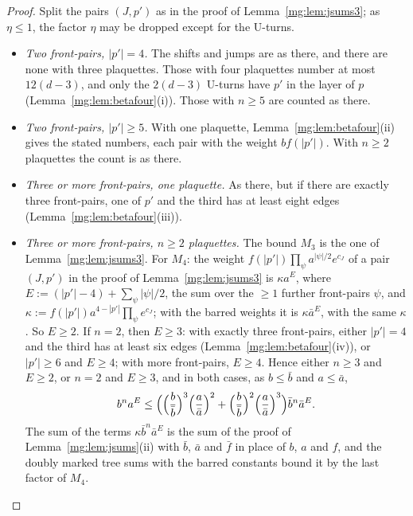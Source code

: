 \documentclass[11pt,a4paper]{article}
\theoremstyle{definition}
\theoremstyle{remark}
\begin{document}
\begin{proof}
Split the pairs $(J,p')$ as in the proof of Lemma~\ref{mg:lem:jsums3}; as $\eta\le1$, the factor $\eta$ may be dropped except for the U-turns.
\begin{itemize}
\item \emph{Two front-pairs, $|p'|=4$.} The shifts and jumps are as there, and there are none with three plaquettes. Those with four plaquettes number at most
$12(d-3)$, and only the $2(d-3)$ U-turns have $p'$ in the layer of $p$ (Lemma~\ref{mg:lem:betafour}(i)). Those with $n\ge5$ are counted as there.
\item \emph{Two front-pairs, $|p'|\ge5$.} With one plaquette, Lemma~\ref{mg:lem:betafour}(ii) gives the stated numbers, each pair with the weight $bf(|p'|)$. With
$n\ge2$ plaquettes the count is as there.
\item \emph{Three or more front-pairs, one plaquette.} As there, but if there are exactly three front-pairs, one of $p'$ and the third has at least eight edges
(Lemma~\ref{mg:lem:betafour}(iii)).
\item \emph{Three or more front-pairs, $n\ge2$ plaquettes.} The bound $M_3$ is the one of Lemma~\ref{mg:lem:jsums3}. For $M_4$: the weight
$f(|p'|)\prod_\psi a^{|\psi|/2}e^{c_J}$ of a pair $(J,p')$ in the proof of Lemma~\ref{mg:lem:jsums3} is $\kappa a^E$, where $E:=(|p'|-4)+\sum_\psi|\psi|/2$, the sum over the
$\ge1$ further front-pairs $\psi$, and $\kappa:=f(|p'|)a^{4-|p'|}\prod_\psi e^{c_J}$; with the barred weights it is $\kappa\bar a^E$, with the same $\kappa$. So $E\ge2$. If $n=2$, then $E\ge3$: with exactly three front-pairs, either
$|p'|=4$ and the third has at least six edges (Lemma~\ref{mg:lem:betafour}(iv)), or $|p'|\ge6$ and $E\ge4$; with more front-pairs, $E\ge4$. Hence either $n\ge3$
and $E\ge2$, or $n=2$ and $E\ge3$, and in both cases, as $b\le\bar b$ and $a\le\bar a$,
\[
b^na^E\le\Bigl(\Bigl(\frac b{\bar b}\Bigr)^3\Bigl(\frac a{\bar a}\Bigr)^2+\Bigl(\frac b{\bar b}\Bigr)^2\Bigl(\frac a{\bar a}\Bigr)^3\Bigr)\bar b^n\bar a^E .
\]
The sum of the terms $\kappa\bar b^n\bar a^E$ is the sum of the proof of Lemma~\ref{mg:lem:jsums}(ii) with $\bar b$, $\bar a$ and $\bar f$ in place of $b$, $a$ and $f$,
and the doubly marked tree sums with the barred constants bound it by the last factor of $M_4$.\qedhere
\end{itemize}
\end{proof}
\end{document}
